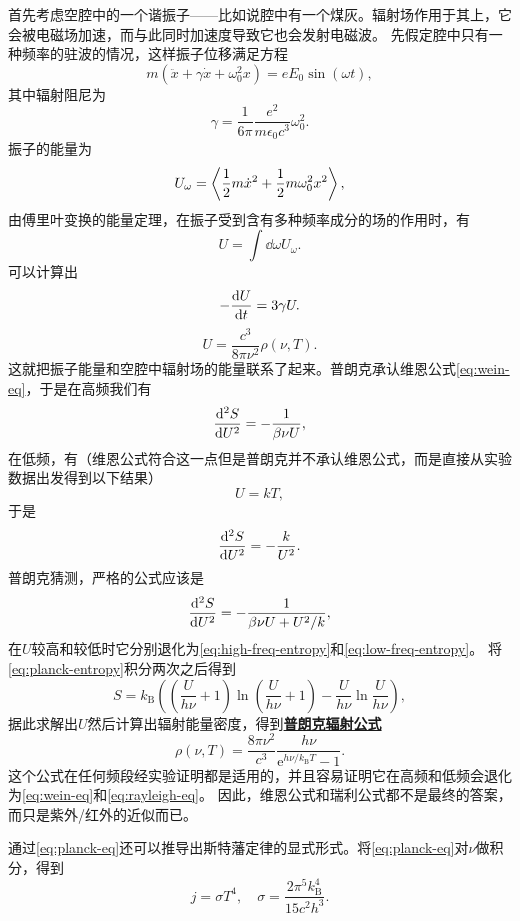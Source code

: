 \documentclass[UTF8, a4paper]{ctexart}
\newcommand*{\ee}{\mathrm{e}}
\newcommand{\concept}[1]{\underline{\textbf{#1}}}
\begin{document}
首先考虑空腔中的一个谐振子——比如说腔中有一个煤灰。辐射场作用于其上，它会被电磁场加速，而与此同时加速度导致它也会发射电磁波。
先假定腔中只有一种频率的驻波的情况，这样振子位移满足方程
\[
    m(\ddot{x} + \gamma \dot{x} + \omega_0^2 x) = e E_0 \sin(\omega t),
\]
其中辐射阻尼为
\[
    \gamma = \frac{1}{6\pi} \frac{e^2}{m \epsilon_0 c^3} \omega_0^2.
\]
振子的能量为
\[
    U_\omega = \expval{\frac{1}{2} m \dot{x}^2 + \frac{1}{2} m \omega_0^2 x^2},
\]
由傅里叶变换的能量定理，在振子受到含有多种频率成分的场的作用时，有
\[
    U = \int \dd{\omega} U_\omega.
\]
可以计算出
\[
    - \dv{U}{t} = 3\gamma U.
\]
\begin{equation}
    U = \frac{c^3}{8\pi \nu^2} \rho(\nu, T).
\end{equation}
这就把振子能量和空腔中辐射场的能量联系了起来。普朗克承认维恩公式\eqref{eq:wein-eq}，于是在高频我们有
\begin{equation}
    \dv[2]{S}{U} = - \frac{1}{\beta \nu U},
    \label{eq:high-freq-entropy}
\end{equation}
在低频，有（维恩公式符合这一点但是普朗克并不承认维恩公式，而是直接从实验数据出发得到以下结果）
\[
    U = k T,
\]
于是
\begin{equation}
    \dv[2]{S}{U} = - \frac{k}{U^2}.
    \label{eq:low-freq-entropy}
\end{equation}
普朗克猜测，严格的公式应该是
\begin{equation}
    \dv[2]{S}{U} = - \frac{1}{\beta \nu U + U^2 / k},
    \label{eq:planck-entropy}
\end{equation}
在$U$较高和较低时它分别退化为\eqref{eq:high-freq-entropy}和\eqref{eq:low-freq-entropy}。
将\eqref{eq:planck-entropy}积分两次之后得到
\begin{equation}
    S = k_\text{B} \left( \left( \frac{U}{h \nu} + 1 \right) \ln \left( \frac{U}{h \nu} + 1 \right) - \frac{U}{h \nu} \ln \frac{U}{h \nu} \right),
    \label{eq:planck-entropy-energy}
\end{equation}
据此求解出$U$然后计算出辐射能量密度，得到\concept{普朗克辐射公式}
\begin{equation}
    \rho(\nu, T) = \frac{8\pi \nu^2}{c^3} \frac{h \nu}{\ee^{h \nu / k_\text{B} T} - 1}.
    \label{eq:planck-eq}
\end{equation}
这个公式在任何频段经实验证明都是适用的，并且容易证明它在高频和低频会退化为\eqref{eq:wein-eq}和\eqref{eq:rayleigh-eq}。
因此，维恩公式和瑞利公式都不是最终的答案，而只是紫外/红外的近似而已。

通过\eqref{eq:planck-eq}还可以推导出斯特藩定律的显式形式。将\eqref{eq:planck-eq}对$\nu$做积分，得到
\begin{equation}
    j = \sigma T^4, \quad \sigma = \frac{2 \pi^5 k_\text{B}^4}{15 c^2 h^3}.
\end{equation}
\end{document}
